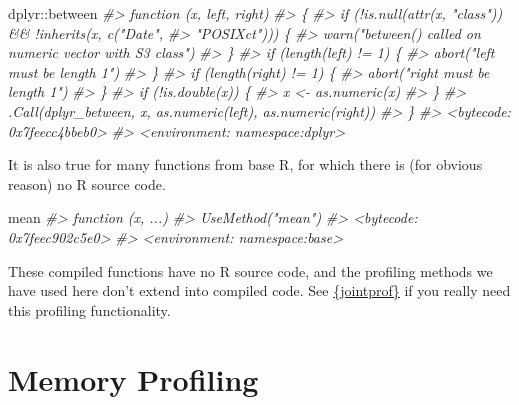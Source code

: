 \documentclass[
  12pt,
]{book}
\newenvironment{Shaded}{\begin{snugshade}}{\end{snugshade}}
\newcommand{\CommentTok}[1]{\textcolor[rgb]{0.56,0.35,0.01}{\textit{#1}}}
\newcommand{\NormalTok}[1]{#1}
\newcommand{\SpecialCharTok}[1]{\textcolor[rgb]{0.00,0.00,0.00}{#1}}
\begin{document}
\begin{Shaded}
\begin{Highlighting}[]
\NormalTok{dplyr}\SpecialCharTok{::}\NormalTok{between}
\CommentTok{\#\textgreater{} function (x, left, right) }
\CommentTok{\#\textgreater{} \{}
\CommentTok{\#\textgreater{}     if (!is.null(attr(x, "class")) \&\& !inherits(x, c("Date", }
\CommentTok{\#\textgreater{}         "POSIXct"))) \{}
\CommentTok{\#\textgreater{}         warn("between() called on numeric vector with S3 class")}
\CommentTok{\#\textgreater{}     \}}
\CommentTok{\#\textgreater{}     if (length(left) != 1) \{}
\CommentTok{\#\textgreater{}         abort("\textasciigrave{}left\textasciigrave{} must be length 1")}
\CommentTok{\#\textgreater{}     \}}
\CommentTok{\#\textgreater{}     if (length(right) != 1) \{}
\CommentTok{\#\textgreater{}         abort("\textasciigrave{}right\textasciigrave{} must be length 1")}
\CommentTok{\#\textgreater{}     \}}
\CommentTok{\#\textgreater{}     if (!is.double(x)) \{}
\CommentTok{\#\textgreater{}         x \textless{}{-} as.numeric(x)}
\CommentTok{\#\textgreater{}     \}}
\CommentTok{\#\textgreater{}     .Call(dplyr\_between, x, as.numeric(left), as.numeric(right))}
\CommentTok{\#\textgreater{} \}}
\CommentTok{\#\textgreater{} \textless{}bytecode: 0x7feecc4bbeb0\textgreater{}}
\CommentTok{\#\textgreater{} \textless{}environment: namespace:dplyr\textgreater{}}
\end{Highlighting}
\end{Shaded}

It is also true for many functions from base R, for which there is (for obvious reason) no R source code.

\begin{Shaded}
\begin{Highlighting}[]
\NormalTok{mean}
\CommentTok{\#\textgreater{} function (x, ...) }
\CommentTok{\#\textgreater{} UseMethod("mean")}
\CommentTok{\#\textgreater{} \textless{}bytecode: 0x7feec902c5e0\textgreater{}}
\CommentTok{\#\textgreater{} \textless{}environment: namespace:base\textgreater{}}
\end{Highlighting}
\end{Shaded}

These compiled functions have no R source code, and the profiling methods we have used here don't extend into compiled code. See \href{https://github.com/r-prof/jointprof}{\{jointprof\}} if you really need this profiling functionality.

\hypertarget{memory-profiling}{%
\section{Memory Profiling}\label{memory-profiling}}
\end{document}
